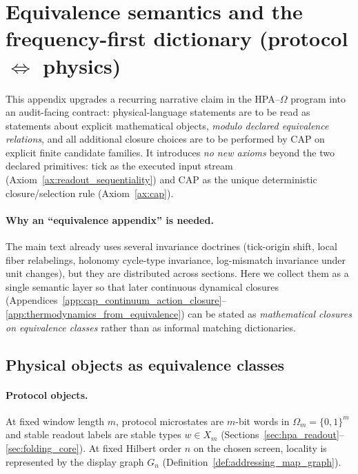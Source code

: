 \section{Equivalence semantics and the frequency-first dictionary (protocol \texorpdfstring{$\Leftrightarrow$}{<->} physics)}
\label{app:equivalence_semantics}

This appendix upgrades a recurring narrative claim in the HPA--$\Omega$ program into an audit-facing contract:
physical-language statements are to be read as statements about explicit mathematical objects, \emph{modulo declared equivalence relations}, and all additional closure choices are to be performed by CAP on explicit finite candidate families.
It introduces \emph{no new axioms} beyond the two declared primitives:
tick as the executed input stream (Axiom~\ref{ax:readout_sequentiality}) and CAP as the unique deterministic closure/selection rule (Axiom~\ref{ax:cap}).

\paragraph{Why an ``equivalence appendix'' is needed.}
The main text already uses several invariance doctrines (tick-origin shift, local fiber relabelings, holonomy cycle-type invariance, log-mismatch invariance under unit changes), but they are distributed across sections.
Here we collect them as a single semantic layer so that later continuous dynamical closures (Appendices~\ref{app:cap_continuum_action_closure}--\ref{app:thermodynamics_from_equivalence}) can be stated as \emph{mathematical closures on equivalence classes} rather than as informal matching dictionaries.

\subsection{Physical objects as equivalence classes}
\label{subsec:equivalence_physical_objects}

\paragraph{Protocol objects.}
\MathTag At fixed window length $m$, protocol microstates are $m$-bit words in $\Omega_m=\{0,1\}^m$ and stable readout labels are stable types $w\in X_m$ (Sections~\ref{sec:hpa_readout}--\ref{sec:folding_core}).
At fixed Hilbert order $n$ on the chosen screen, locality is represented by the display graph $G_n$ (Definition~\ref{def:addressing_map_graph}).

